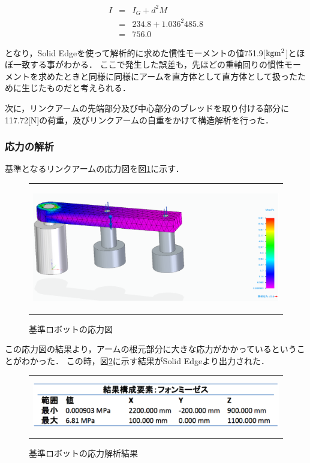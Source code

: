 \begin{eqnarray}
  I &=& I_G+d^2M \nonumber \\
    &=& 234.8 + 1.036^{2} 485.8 \nonumber \\
    &=& 756.0 
  \label{solveBasisKansei}
\end{eqnarray}

となり，Solid
Edgeを使って解析的に求めた慣性モーメントの値751.9{[}\(\rm kg m^2\){]}とほぼ一致する事がわかる．
ここで発生した誤差も，先ほどの重軸回りの慣性モーメントを求めたときと同様に同様にアームを直方体として直方体として扱ったために生じたものだと考えられる．

次に，リンクアームの先端部分及び中心部分のブレッドを取り付ける部分に117.72{[}N{]}の荷重，及びリンクアームの自重をかけて構造解析を行った．

\subsubsection{応力の解析}\label{ux5fdcux529bux306eux89e3ux6790}

基準となるリンクアームの応力図を図\ref{basis-ouryoku}に示す．

\begin{figure}[htbp]
  \begin{center}
    \begin{tabular}{c}
      \includegraphics[height=5.5cm]{img/eps/basis-ouryoku.eps}
    \end{tabular}
    \caption{基準ロボットの応力図}
    \label{basis-ouryoku}
  \end{center}
\end{figure}

この応力図の結果より，アームの根元部分に大きな応力がかかっているということがわかった．
この時，図\ref{default-ouryoku-result}に示す結果がSolid
Edgeより出力された．

\begin{figure}[htbp]
  \begin{center}
    \begin{tabular}{c}
      \includegraphics[height=2.5cm]{img/eps/default-ouryoku-result.eps}
    \end{tabular}
    \caption{基準ロボットの応力解析結果}
    \label{default-ouryoku-result}
  \end{center}
\end{figure}

